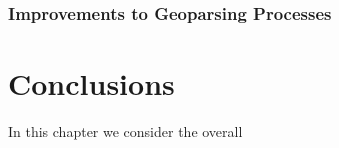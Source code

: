 \documentclass[12pt, a4paper]{report}
\begin{document}





\subsection{Improvements to Geoparsing Processes}
\label{subsec:improvements_processes}




\chapter{Conclusions}


In this chapter we consider the overall 








\end{document}

